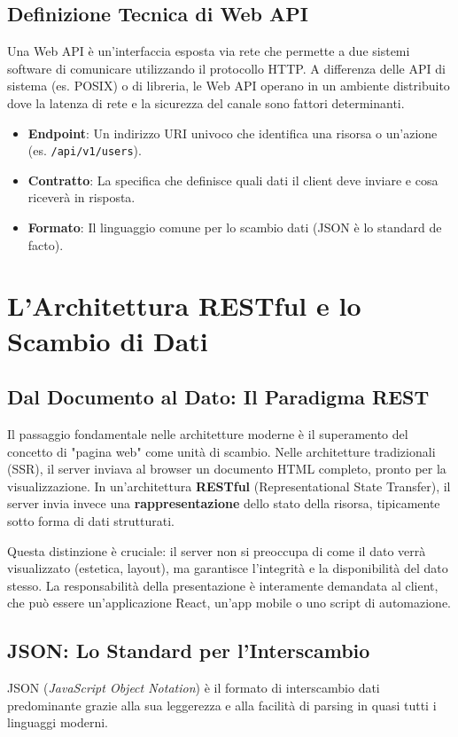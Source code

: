 \documentclass[11pt,a4paper]{report}
\begin{document}
\section{Definizione Tecnica di Web API}
Una Web API è un'interfaccia esposta via rete che permette a due sistemi software di comunicare utilizzando il protocollo HTTP. A differenza delle API di sistema (es. POSIX) o di libreria, le Web API operano in un ambiente distribuito dove la latenza di rete e la sicurezza del canale sono fattori determinanti.

\begin{itemize}
    \item \textbf{Endpoint}: Un indirizzo URI univoco che identifica una risorsa o un'azione (es. \texttt{/api/v1/users}).
    \item \textbf{Contratto}: La specifica che definisce quali dati il client deve inviare e cosa riceverà in risposta.
    \item \textbf{Formato}: Il linguaggio comune per lo scambio dati (JSON è lo standard de facto).
\end{itemize}

\chapter{L'Architettura RESTful e lo Scambio di Dati}

\section{Dal Documento al Dato: Il Paradigma REST}
Il passaggio fondamentale nelle architetture moderne è il superamento del concetto di "pagina web" come unità di scambio. Nelle architetture tradizionali (SSR), il server inviava al browser un documento HTML completo, pronto per la visualizzazione. In un'architettura \textbf{RESTful} (Representational State Transfer), il server invia invece una \textbf{rappresentazione} dello stato della risorsa, tipicamente sotto forma di dati strutturati.

Questa distinzione è cruciale: il server non si preoccupa di come il dato verrà visualizzato (estetica, layout), ma garantisce l'integrità e la disponibilità del dato stesso. La responsabilità della presentazione è interamente demandata al client, che può essere un'applicazione React, un'app mobile o uno script di automazione.

\section{JSON: Lo Standard per l'Interscambio}
JSON (\textit{JavaScript Object Notation}) è il formato di interscambio dati predominante grazie alla sua leggerezza e alla facilità di parsing in quasi tutti i linguaggi moderni.
\end{document}
